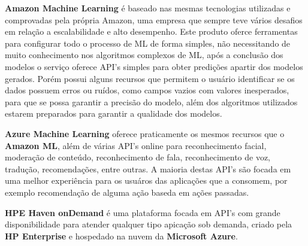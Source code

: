 \begin{alineas}
	\item \textbf{Amazon Machine Learning} é baseado nas mesmas tecnologias utilizadas e comprovadas pela própria Amazon, uma empresa que sempre teve vários
	desafios em relação a escalabilidade e alto desempenho. Este produto oferce ferramentas para configurar todo o processo de ML de forma simples, não necessitando 
	de muito conhecimento nos algoritmos complexos de ML, após a conclusão dos modelos o serviço oferece API's simples para obter predições apartir dos modelos gerados.
	Porém possui alguns recursos que permitem o usuário identificar se os dados possuem erros ou ruídos, como campos vazios com valores inesperados, para que se possa 
	garantir a precisão do modelo, além dos algoritmos utilizados estarem preparados para garantir a qualidade dos modelos.       
	
	\item \textbf{Azure Machine Learning} oferece praticamente os mesmos recursos que o \textbf{Amazon ML}, 
	além de várias API's online para reconhecimento	facial, moderação de conteúdo, reconhecimento de fala, reconhecimento de voz, tradução, recomendações, entre outras. 
	A maioria destas API's são focada em uma melhor experiência para os usuáros das aplicações que a consomem, por exemplo  recomendação de alguma ação baseda em 
	ações passadas.

	\item \textbf{HPE Haven onDemand} é uma plataforma focada em API's com grande disponibilidade para atender qualquer tipo apicação sob demanda,
	 criado pela \textbf{HP Enterprise} e hospedado na nuvem da \textbf{Microsoft Azure}.    	
\end{alineas}







